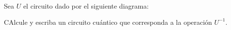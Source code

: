 \documentclass[./../main.tex]{subfiles}
\begin{document}

    \section{}

    Sea \(U\) el circuito dado por el siguiente diagrama:

    \begin{figure}[htb]
        \centering
         
        \label{fig:cuarto-circuito}
    \end{figure}

    CAlcule y escriba un circuito cuántico que corresponda a la operación \(U^{-1}\).
\end{document}
